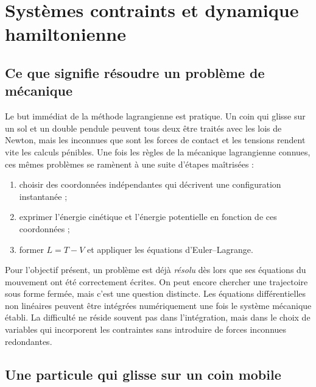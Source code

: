 \chapter{Systèmes contraints et dynamique hamiltonienne}


\section{Ce que signifie résoudre un problème de mécanique}

Le but immédiat de la méthode lagrangienne est pratique. Un coin qui glisse sur un sol et un double pendule peuvent tous deux être traités avec les lois de Newton, mais les inconnues que sont les forces de contact et les tensions rendent vite les calculs pénibles. Une fois les règles de la mécanique lagrangienne connues, ces mêmes problèmes se ramènent à une suite d’étapes maîtrisées :
\begin{enumerate}
  \item choisir des coordonnées indépendantes qui décrivent une configuration instantanée ;
  \item exprimer l’énergie cinétique et l’énergie potentielle en fonction de ces coordonnées ;
  \item former \(L=T-V\) et appliquer les équations d’Euler--Lagrange.
\end{enumerate}

Pour l’objectif présent, un problème est déjà \emph{résolu} dès lors que ses équations du mouvement ont été correctement écrites. On peut encore chercher une trajectoire sous forme fermée, mais c’est une question distincte. Les équations différentielles non linéaires peuvent être intégrées numériquement une fois le système mécanique établi. La difficulté ne réside souvent pas dans l’intégration, mais dans le choix de variables qui incorporent les contraintes sans introduire de forces inconnues redondantes.

\section{Une particule qui glisse sur un coin mobile}

